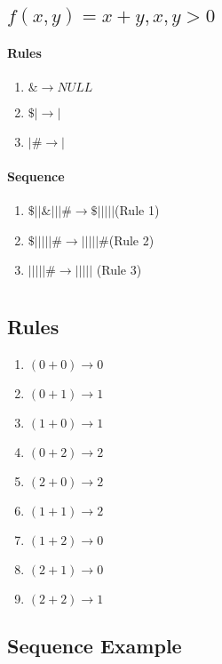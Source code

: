 \documentclass{article}
\begin{document}
  \subsection{$ f(x, y) = x + y, x,y > 0 $}
    \paragraph{Rules}
      \begin{enumerate}
        \item $ \& \rightarrow NULL $
        \item $ \$| \rightarrow | $
        \item $ |\# \rightarrow | $
      \end{enumerate}
    \paragraph{Sequence}
      \begin{enumerate}
        \item $ \$||\&|||\# \rightarrow \$||||| $(Rule 1)
        \item $\$|||||\# \rightarrow |||||\# $(Rule 2)
        \item $|||||\# \rightarrow ||||| $ (Rule 3)
      \end{enumerate}
\section{}
  \subsection{Rules}
      \begin{enumerate}
        \item $ (0 + 0)  \rightarrow 0 $
        \item $ (0 + 1) \rightarrow 1 $
        \item $ (1 + 0) \rightarrow 1 $
        \item $ (0 + 2) \rightarrow 2 $
        \item $ (2 + 0) \rightarrow 2 $
        \item $ (1 + 1) \rightarrow 2 $
        \item $ (1 + 2) \rightarrow 0 $
        \item $ (2 + 1) \rightarrow 0 $
        \item $ (2 + 2) \rightarrow 1 $
      \end{enumerate}
  \subsection{Sequence Example}
\end{document}
